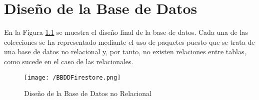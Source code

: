 \chapter{Diseño de la Base de Datos}
En la Figura \ref{fig:bbddfirestore} se muestra el diseño final de la base de datos. Cada una de las colecciones se ha representado mediante el uso de paquetes puesto que se trata de una base de datos no relacional y, por tanto, no existen relaciones entre tablas, como sucede en el caso de las relacionales.

\begin{figure}[!h]
	\begin{center}
		\texttt{[image: /BBDDFirestore.png]}
		\caption{Diseño de la Base de Datos no Relacional}
		\label{fig:bbddfirestore}
	\end{center}
\end{figure}
